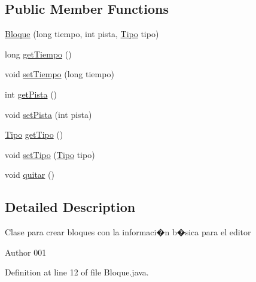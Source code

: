\subsection*{Public Member Functions}
\begin{DoxyCompactItemize}
\item 
\hyperlink{classmain_1_1java_1_1es_1_1deusto_1_1spq_1_1data_1_1_bloque_a7b2e7048be726ab676f30aba17fd9525}{Bloque} (long tiempo, int pista, \hyperlink{enummain_1_1java_1_1es_1_1deusto_1_1spq_1_1data_1_1_bloque_1_1_tipo}{Tipo} tipo)
\item 
long \hyperlink{classmain_1_1java_1_1es_1_1deusto_1_1spq_1_1data_1_1_bloque_a07b95f7375eb215b787970b9ea2bf9a2}{get\+Tiempo} ()
\item 
void \hyperlink{classmain_1_1java_1_1es_1_1deusto_1_1spq_1_1data_1_1_bloque_a6b2064d83d0d4b7b29232c60768b9862}{set\+Tiempo} (long tiempo)
\item 
int \hyperlink{classmain_1_1java_1_1es_1_1deusto_1_1spq_1_1data_1_1_bloque_a2c1a9e5e23c1e02193c03bcb04d64d94}{get\+Pista} ()
\item 
void \hyperlink{classmain_1_1java_1_1es_1_1deusto_1_1spq_1_1data_1_1_bloque_a0cd770e3d3bbf78496bd2717f7f7b2e6}{set\+Pista} (int pista)
\item 
\hyperlink{enummain_1_1java_1_1es_1_1deusto_1_1spq_1_1data_1_1_bloque_1_1_tipo}{Tipo} \hyperlink{classmain_1_1java_1_1es_1_1deusto_1_1spq_1_1data_1_1_bloque_ad49cebd52cb2dcc25ac0d70a2a5fe28f}{get\+Tipo} ()
\item 
void \hyperlink{classmain_1_1java_1_1es_1_1deusto_1_1spq_1_1data_1_1_bloque_ae966d7da2545e1dff3ed02fc828933dc}{set\+Tipo} (\hyperlink{enummain_1_1java_1_1es_1_1deusto_1_1spq_1_1data_1_1_bloque_1_1_tipo}{Tipo} tipo)
\item 
void \hyperlink{classmain_1_1java_1_1es_1_1deusto_1_1spq_1_1data_1_1_bloque_a20587908c1aeede3bd189f441c268bf2}{quitar} ()
\end{DoxyCompactItemize}


\subsection{Detailed Description}
Clase para crear bloques con la informaci�n b�sica para el editor \begin{DoxyAuthor}{Author}
001 
\end{DoxyAuthor}


Definition at line 12 of file Bloque.\+java.



